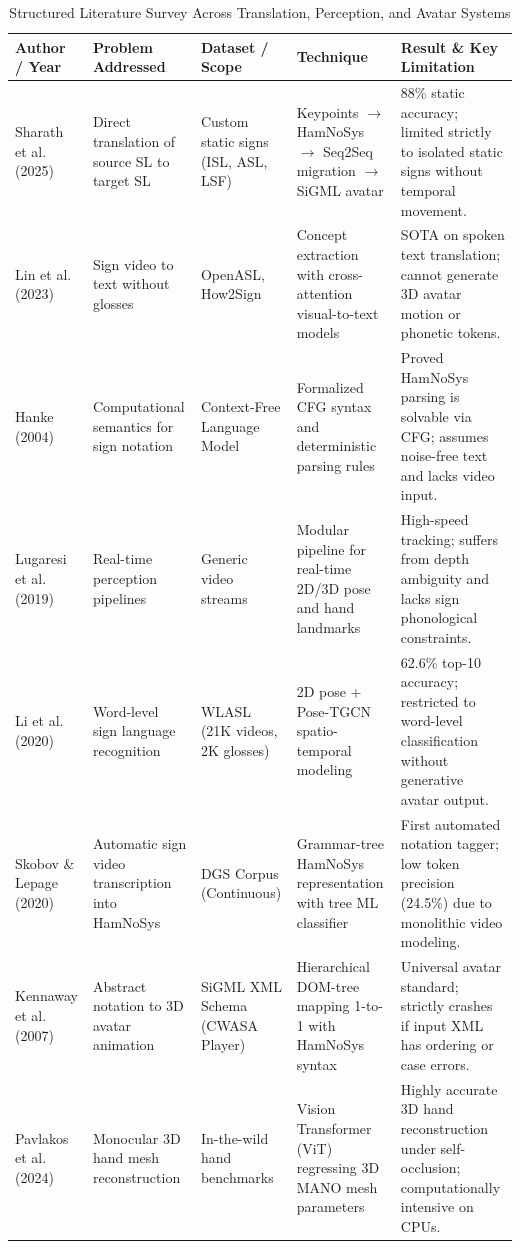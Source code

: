 \documentclass[11pt, a4paper]{article}
\begin{document}
\begin{table}[H]
    \centering
    \scriptsize
    \renewcommand{\arraystretch}{1.25}
    \begin{tabular}{|p{2.4cm}|p{2.6cm}|p{2.6cm}|p{3.5cm}|p{3.8cm}|}
        \hline
        \textbf{Author / Year} & \textbf{Problem Addressed} & \textbf{Dataset / Scope} & \textbf{Technique} & \textbf{Result \& Key Limitation} \\
        \hline
        Sharath et al. (2025)~\cite{sharath2025} & Direct translation of source SL to target SL & Custom static signs (ISL, ASL, LSF) & Keypoints $\to$ HamNoSys $\to$ Seq2Seq migration $\to$ SiGML avatar & 88\% static accuracy; limited strictly to isolated static signs without temporal movement. \\
        \hline
        Lin et al. (2023)~\cite{lin2023} & Sign video to text without glosses & OpenASL, How2Sign & Concept extraction with cross-attention visual-to-text models & SOTA on spoken text translation; cannot generate 3D avatar motion or phonetic tokens. \\
        \hline
        Hanke (2004)~\cite{hanke2004} & Computational semantics for sign notation & Context-Free Language Model & Formalized CFG syntax and deterministic parsing rules & Proved HamNoSys parsing is solvable via CFG; assumes noise-free text and lacks video input. \\
        \hline
        Lugaresi et al. (2019)~\cite{lugaresi2019} & Real-time perception pipelines & Generic video streams & Modular pipeline for real-time 2D/3D pose and hand landmarks & High-speed tracking; suffers from depth ambiguity and lacks sign phonological constraints. \\
        \hline
        Li et al. (2020)~\cite{li2020wlasl} & Word-level sign language recognition & WLASL (21K videos, 2K glosses) & 2D pose + Pose-TGCN spatio-temporal modeling & 62.6\% top-10 accuracy; restricted to word-level classification without generative avatar output. \\
        \hline
        Skobov \& Lepage (2020)~\cite{skobov2020} & Automatic sign video transcription into HamNoSys & DGS Corpus (Continuous) & Grammar-tree HamNoSys representation with tree ML classifier & First automated notation tagger; low token precision (24.5\%) due to monolithic video modeling. \\
        \hline
        Kennaway et al. (2007)~\cite{kennaway2007} & Abstract notation to 3D avatar animation & SiGML XML Schema (CWASA Player) & Hierarchical DOM-tree mapping 1-to-1 with HamNoSys syntax & Universal avatar standard; strictly crashes if input XML has ordering or case errors. \\
        \hline
        Pavlakos et al. (2024)~\cite{pavlakos2024} & Monocular 3D hand mesh reconstruction & In-the-wild hand benchmarks & Vision Transformer (ViT) regressing 3D MANO mesh parameters & Highly accurate 3D hand reconstruction under self-occlusion; computationally intensive on CPUs. \\
        \hline
    \end{tabular}
    \caption{Structured Literature Survey Across Translation, Perception, and Avatar Systems}
    \label{tab:lit_survey}
\end{table}
\end{document}
